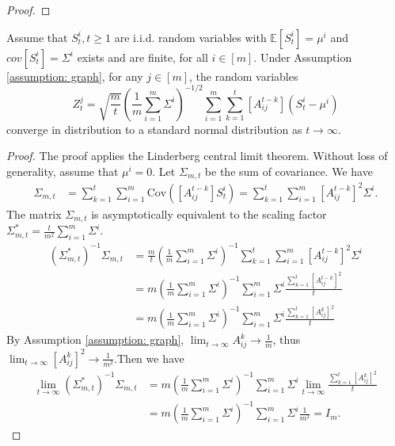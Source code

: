 \documentclass[twoside,11pt]{article}
\numberwithin{equation}{section}
\newcommand{\E}{\mathbb{E}}
\begin{document}
{\begin{proof}
\end{proof}
\begin{lemma} \label{lemma:distributed-CLT}
    Assume that $S_t^i, t \geq 1$ are i.i.d. random variables with $\E[S_t^i] = \mu^i$ and $cov[S_t^i] = \Sigma^i$ exists and are finite, for all $ i \in [m]$. Under Assumption \ref{assumption: graph}, for any $j \in [m]$, the random variables
    \begin{equation*}
        Z_t^j = \sqrt{\frac{m}{t}}\left(\frac{1}{m}\sum_{i = 1}^m \Sigma^i \right)^{-1/2} \sum_{i = 1}^m\sum_{k = 1}^t [A_{ij}^{t-k}](S_t^i - \mu^i)
    \end{equation*}
    converge in distribution to a standard normal distribution as $t \to \infty$. 
\end{lemma}
\begin{proof}
    The proof applies the Linderberg central limit theorem. Without loss of generality, assume that $\mu^i = 0$. Let $\Sigma_{m,t}$ be the sum of covariance. We have
    \begin{align*}
        \Sigma_{m,t} &=  \sum_{k = 1}^t \sum_{i = 1}^m \text{Cov}([A_{ij}^{t-k}]S_t^i) =   \sum_{k = 1}^t \sum_{i = 1}^m[A_{ij}^{t-k}]^2 \Sigma^i . 
    \end{align*}
The matrix $\Sigma_{m,t}$ is asymptotically equivalent to the scaling factor $\Sigma_{m,t}^* = \frac{t}{m^2} \sum_{i = 1}^m  \Sigma^i$. 
    \begin{align*}
        \left(\Sigma_{m,t}^* \right)^{-1}\Sigma_{m,t} &= \frac{m}{t}  \left(\frac{1}{m} \sum_{i = 1}^m  \Sigma^i\right)^{-1}  \sum_{k = 1}^t \sum_{i = 1}^m[A_{ij}^{t-k}]^2 \Sigma^i  \\
        &=m  \left(\frac{1}{m} \sum_{i = 1}^m  \Sigma^i\right)^{-1} \sum_{i = 1}^m \Sigma^i \frac{\sum_{k = 1}^t[A_{ij}^{t-k}]^2 }{t} \\
        &= m  \left(\frac{1}{m} \sum_{i = 1}^m  \Sigma^i\right)^{-1} \sum_{i = 1}^m \Sigma^i \frac{\sum_{k = 1}^t[A_{ij}^k]^2 }{t}
    \end{align*}
    By Assumption \ref{assumption: graph}, $\lim_{t \to \infty}A_{ij}^k \to \frac{1}{m}$, thus $\lim_{t \to \infty}[A_{ij}^k]^2 \to \frac{1}{m^2}$.Then we have
    \begin{align*}
        \lim_{t \to \infty}   \left(\Sigma_{m,t}^* \right)^{-1}\Sigma_{m,t} &= m  \left(\frac{1}{m} \sum_{i = 1}^m  \Sigma^i\right)^{-1} \sum_{i = 1}^m \Sigma^i  \lim_{t \to \infty} \frac{\sum_{k = 1}^t[A_{ij}^k]^2 }{t} \\
        &=  m  \left(\frac{1}{m} \sum_{i = 1}^m  \Sigma^i\right)^{-1} \sum_{i = 1}^m \Sigma^i  \frac{1}{m^2} = I_m. 

\end{align*}
\end{proof}}
\end{document}
